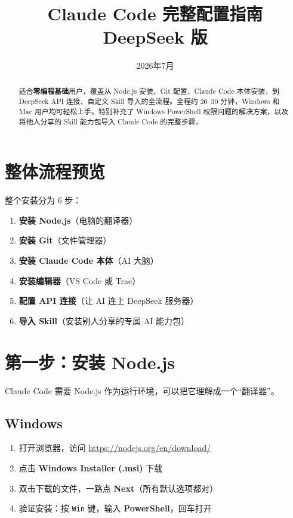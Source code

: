 \documentclass[12pt,a4paper]{ctexart}
\title{\textbf{Claude Code 完整配置指南\\[4pt]
\large DeepSeek 版}}
\author{}
\date{2026年7月}
\begin{document}
\maketitle

\begin{abstract}
\noindent 适合\textbf{零编程基础}用户，覆盖从 Node.js 安装、Git 配置、Claude Code 本体安装，到 DeepSeek API 连接、自定义 Skill 导入的全流程。全程约 20--30 分钟，Windows 和 Mac 用户均可轻松上手。特别补充了 Windows PowerShell 权限问题的解决方案，以及将他人分享的 Skill 能力包导入 Claude Code 的完整步骤。
\end{abstract}

\newpage

\tableofcontents

\newpage

\section{整体流程预览}

整个安装分为 6 步：

\begin{enumerate}[nosep]
    \item \textbf{安装 Node.js}（电脑的翻译器）
    \item \textbf{安装 Git}（文件管理器）
    \item \textbf{安装 Claude Code 本体}（AI 大脑）
    \item \textbf{安装编辑器}（VS Code 或 Trae）
    \item \textbf{配置 API 连接}（让 AI 连上 DeepSeek 服务器）
    \item \textbf{导入 Skill}（安装别人分享的专属 AI 能力包）
\end{enumerate}

\section{第一步：安装 Node.js}

Claude Code 需要 Node.js 作为运行环境，可以把它理解成一个``翻译器''。

\subsection{Windows}

\begin{enumerate}[nosep]
    \item 打开浏览器，访问 \url{https://nodejs.org/en/download/}
    \item 点击 \textbf{Windows Installer (.msi)} 下载
    \item 双击下载的文件，一路点 \textbf{Next}（所有默认选项都对）
    \item 验证安装：按 \texttt{Win} 键，输入 \textbf{PowerShell}，回车打开
\end{enumerate}
\end{document}
